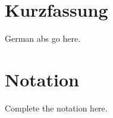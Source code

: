 \documentclass[oneside]{scrbook}
\theoremstyle{definition}
\theoremstyle{definition}
\theoremstyle{remark}
\begin{document}
% 
%                                                               
%                                                               
%                                                               
% 
\chapter{Kurzfassung}
German abs go here.

% 
%                                                                                         
%                                                                                         
%                                                                                         
% 
\chapter{Notation}
Complete the notation here.

% 
%                                              
%                                              
%                                              
% 
\mainmatter






\end{document}
